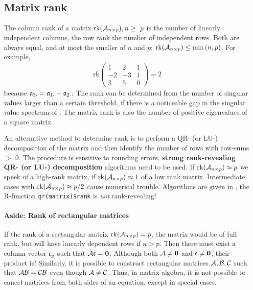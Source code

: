 \subsection{Matrix rank}

The column rank of a matrix \(\mathrm{rk}(\mathcal{A}_{n\times p}), n \geq\ p \) is the number of linearly independent columns, the row rank the number of independent rows. Both are always equal, and at most the smaller of \(n \) and \(p \): \(\mathrm{rk}(\mathcal{A}_{n\times p}) \leq \min{(n, p)} \). For example,
\begin{gather}
  \mathrm{rk} \begin{pmatrix}
        1 &  2 & 1 \\
       -2 & -3 & 1 \\
        3 &  5 & 0
     \end{pmatrix} = 2
\end{gather}
because \(\mathfrak{a}_{3\cdot} = \mathfrak{a}_{1\cdot} - \mathfrak{a}_{2\cdot} \). The rank can be determined from the number of singular values larger than a certain threshold, if there is a noticeable gap in the singular value spectrum of . The matrix rank is also the number of positive eigenvalues of a square matrix.

An alternative method to determine rank is to perform a QR- (or LU-) decomposition of the matrix and then identify the number of rows with row-sums \(> \) 0. The procedure is sensitive to rounding errors, \textbf{strong rank-revealing QR- (or LU-) decomposition} algorithms need to be used. If \(\mathrm{rk}(\mathcal{A}_{n\times p}) \approx p \)  we speek of a high-rank matrix, if \(\mathrm{rk}(\mathcal{A}_{n\times p}) \approx 1 \) of a low rank matrix. Intermediate cases with \(\mathrm{rk}(\mathcal{A}_{n\times p}) \approx p/2 \) cause numerical trouble. Algorithms are given in \parencite{Mar-15, Gu-96}, the R-function \texttt{qr(matrix)\$rank} is \emph{not} rank-revealing!

\paragraph{Aside: Rank of rectangular matrices}

If the rank of a rectangular matrix \(\mathrm{rk}(\mathcal{A}_{n\times p}) = p \), the matrix would be of full rank, but will have linearly dependent rows if \(n > p \). Then there must exist a column vector \(\mathfrak{c}_p \) such that \(\mathcal{A}\mathfrak{c} = \mathbf{0} \). Although both \(\mathcal{A} \neq \mathbf{0} \) and \(\mathfrak{c} \neq \mathbf{0} \), their product is! Similarly, it is possible to construct rectangular matrices \(\mathcal{A, B, C} \) such that \(\mathcal{AB} = \mathcal{CB} \) even though \(\mathcal{A} \neq \mathcal{C} \). Thus, in matrix algebra, it is not possible to cancel matrices from both sides of an equation, except in special cases.

